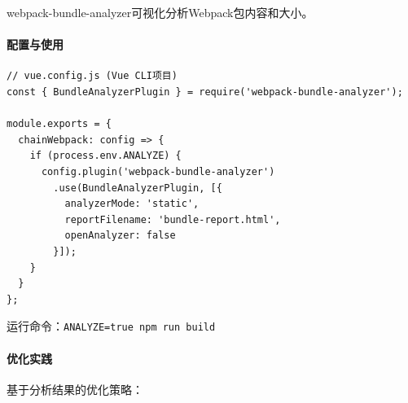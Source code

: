 webpack-bundle-analyzer可视化分析Webpack包内容和大小。

\paragraph{配置与使用}\label{ux914dux7f6eux4e0eux4f7fux7528}

\begin{lstlisting}
// vue.config.js (Vue CLI项目)
const { BundleAnalyzerPlugin } = require('webpack-bundle-analyzer');

module.exports = {
  chainWebpack: config => {
    if (process.env.ANALYZE) {
      config.plugin('webpack-bundle-analyzer')
        .use(BundleAnalyzerPlugin, [{
          analyzerMode: 'static',
          reportFilename: 'bundle-report.html',
          openAnalyzer: false
        }]);
    }
  }
};
\end{lstlisting}

运行命令：\passthrough{\lstinline!ANALYZE=true npm run build!}

\paragraph{优化实践}\label{ux4f18ux5316ux5b9eux8df5}

基于分析结果的优化策略：

